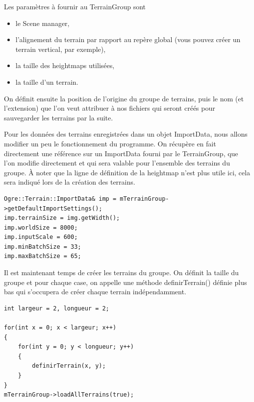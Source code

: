\documentclass[10pt,a4paper]{report}
\begin{document}
Les param\`etres \`a fournir au TerrainGroup sont
\begin{itemize}
\item le Scene manager,
\item l'alignement du terrain par rapport au rep\`ere global (vous pouvez cr\'eer un terrain vertical, par exemple),
\item la taille des heightmaps utilis\'ees, 
\item la taille d'un terrain.
\end{itemize}

On d\'efinit ensuite la position de l'origine du groupe de terrains, puis le nom (et l'extension) que l'on veut attribuer \`a nos fichiers qui seront cr\'e\'es pour sauvegarder les terrains par la suite.

Pour les donn\'ees des terrains enregistr\'ees dans un objet ImportData, nous allons modifier un peu le fonctionnement du programme. On r\'ecup\`ere en fait directement une r\'ef\'erence sur un ImportData fourni par le TerrainGroup, que l'on modifie directement et qui sera valable pour l'ensemble des terrains du groupe. \`A noter que la ligne de d\'efinition de la heightmap n'est plus utile ici, cela sera indiqu\'e lors de la cr\'eation des terrains.

\begin{lstlisting}[caption={}]
Ogre::Terrain::ImportData& imp = mTerrainGroup->getDefaultImportSettings();
imp.terrainSize = img.getWidth();
imp.worldSize = 8000;
imp.inputScale = 600;
imp.minBatchSize = 33;
imp.maxBatchSize = 65;
\end{lstlisting}

Il est maintenant temps de cr\'eer les terrains du groupe. On d\'efinit la taille du groupe et pour chaque case, on appelle une m\'ethode definirTerrain() d\'efinie plus bas qui s'occupera de cr\'eer chaque terrain ind\'ependamment.

\begin{lstlisting}[caption={Cr\'eation des terrains du groupe}]
int largeur = 2, longueur = 2;

for(int x = 0; x < largeur; x++)
{
    for(int y = 0; y < longueur; y++)
    {
        definirTerrain(x, y);
    }
}
mTerrainGroup->loadAllTerrains(true);
\end{lstlisting}
\end{document}
